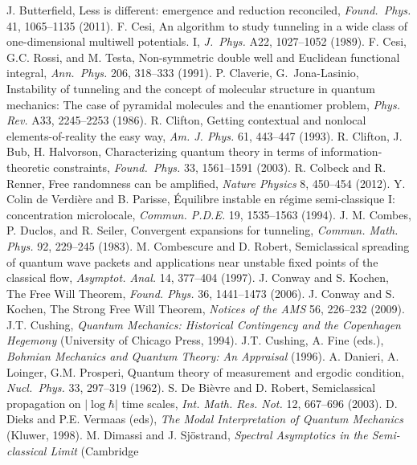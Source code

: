 \documentclass[12pt]{article}
\begin{document}
\begin{thebibliography}{99}
\begin{footnotesize}
 J. Butterfield, Less is different: emergence and reduction reconciled,  \emph{Found.\ Phys.} 41, 1065--1135 (2011).
  F. Cesi, An algorithm to study tunneling in a wide class of one-dimensional multiwell potentials. I, \emph{J.\ Phys.} A22, 1027--1052 (1989). 
  F. Cesi, G.C. Rossi, and M. Testa, Non-symmetric double well and Euclidean functional integral, \emph{Ann.\ Phys.} 206, 318--333 (1991). 
P. Claverie, G.\ Jona-Lasinio, Instability of tunneling and the concept of molecular structure in quantum mechanics: The case of pyramidal molecules and the enantiomer problem, \emph{Phys. Rev.}  A33, 2245--2253 (1986).
R. Clifton, Getting contextual and nonlocal elements-of-reality the easy way, \emph{Am. J. Phys.}
 61, 443--447 (1993).
 R. Clifton, J. Bub, H. Halvorson, Characterizing quantum theory in terms of information-theoretic constraints, \emph{Found.\ Phys.}
 33,  1561--1591 (2003). 
 R. Colbeck and R. Renner, Free randomness can be amplified, \emph{Nature Physics} 8, 450--454 (2012).
Y.  Colin de Verdi\`{e}re and B. Parisse,  \'{E}quilibre instable en r\'{e}gime semi-classique I: concentration
microlocale, \emph{Commun. P.D.E.} 19, 1535--1563 (1994).
   J. M. Combes, P. Duclos, and R. Seiler, Convergent expansions for tunneling, \emph{Commun. Math. Phys.} 92, 229--245 (1983).
  M. Combescure and D. Robert,  Semiclassical spreading of quantum wave packets and applications near unstable fixed points of the classical flow, \emph{Asymptot. Anal.} 14, 377--404 (1997).
 J. Conway and S. Kochen, The Free Will Theorem, 
 \emph{Found. Phys.}  36, 1441--1473 (2006).
  J. Conway and S. Kochen,
  The Strong Free Will Theorem, 
 \emph{Notices of the AMS} 56, 226--232 (2009).
   J.T. Cushing, \emph{Quantum Mechanics: Historical Contingency and the Copenhagen Hegemony}
 (University of Chicago Press, 1994).
   J.T. Cushing, A. Fine (eds.), \emph{Bohmian Mechanics and Quantum Theory: An Appraisal} (1996).
   A. Danieri, A. Loinger, G.M. Prosperi, Quantum theory of measurement and ergodic
condition,  \emph{Nucl.\ Phys.}  33, 297--319 (1962).
  S. De Bi\`{e}vre and D. Robert, Semiclassical propagation on $|\log \hbar|$ time scales,
\emph{Int. Math. Res. Not.} 12, 667--696 (2003).
 D. Dieks and P.E. Vermaas (eds), \emph{The Modal Interpretation of Quantum Mechanics} (Kluwer, 1998). 
 M. Dimassi and J. Sj\"{o}strand, \emph{Spectral Asymptotics in the Semi-classical Limit} (Cambridge 

\end{footnotesize}
\end{thebibliography}
\end{document}
